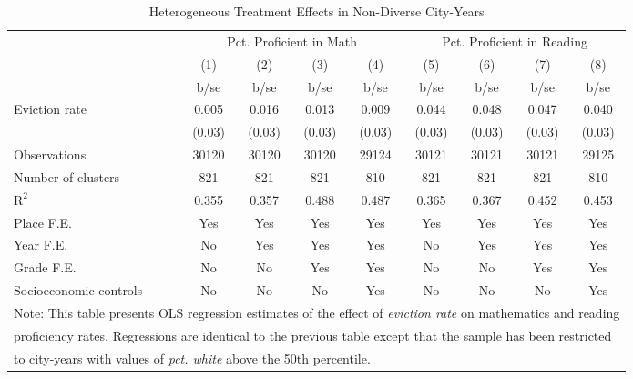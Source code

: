\begin{table}[htbp]\centering
\def\sym#1{\ifmmode^{#1}\else\(^{#1}\)\fi}
\caption{Heterogeneous Treatment Effects in Non-Diverse City-Years}
\begin{tabular}{l*{8}{c}}
\toprule
                    &\multicolumn{4}{c}{Pct. Proficient in Math}        &\multicolumn{4}{c}{Pct. Proficient in Reading}     \\\cmidrule(lr){2-5}\cmidrule(lr){6-9}
                    &\multicolumn{1}{c}{(1)}&\multicolumn{1}{c}{(2)}&\multicolumn{1}{c}{(3)}&\multicolumn{1}{c}{(4)}&\multicolumn{1}{c}{(5)}&\multicolumn{1}{c}{(6)}&\multicolumn{1}{c}{(7)}&\multicolumn{1}{c}{(8)}\\
                    &        b/se&        b/se&        b/se&        b/se&        b/se&        b/se&        b/se&        b/se\\
\midrule
Eviction rate       &       0.005&       0.016&       0.013&       0.009&       0.044&       0.048&       0.047&       0.040\\
                    &      (0.03)&      (0.03)&      (0.03)&      (0.03)&      (0.03)&      (0.03)&      (0.03)&      (0.03)\\
\midrule
Observations        &       30120&       30120&       30120&       29124&       30121&       30121&       30121&       29125\\
Number of clusters  &         821&         821&         821&         810&         821&         821&         821&         810\\
$\text{R}^2$        &       0.355&       0.357&       0.488&       0.487&       0.365&       0.367&       0.452&       0.453\\
Place F.E.          &         Yes&         Yes&         Yes&         Yes&         Yes&         Yes&         Yes&         Yes\\
Year F.E.           &          No&         Yes&         Yes&         Yes&          No&         Yes&         Yes&         Yes\\
Grade F.E.          &          No&          No&         Yes&         Yes&          No&          No&         Yes&         Yes\\
Socioeconomic controls&          No&          No&          No&         Yes&          No&          No&          No&         Yes\\
\bottomrule
\multicolumn{9}{l}{\footnotesize Note: This table presents OLS regression estimates of the effect of \emph{eviction rate} on mathematics and reading}\\
\multicolumn{9}{l}{\footnotesize proficiency rates. Regressions are identical to the previous table except that the sample has been restricted}\\
\multicolumn{9}{l}{\footnotesize to city-years with values of \emph{pct. white} above the 50th percentile.}\\
\end{tabular}
\end{table}
